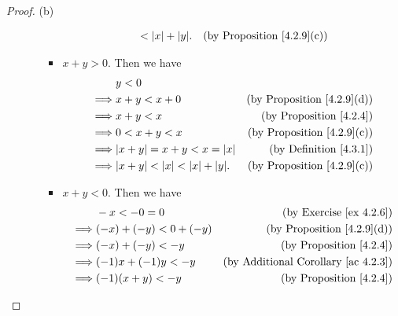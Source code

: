 \begin{proof}{(b)}
\begin{itemize}
\begin{itemize}
\begin{itemize}
\begin{align*}
                                                   & < \abs*{x} + \abs*{y}. & \text{(by Proposition \ref{4.2.9}(c))}
                                  \end{align*}
                            \item \(x + y > 0\).
                                  Then we have
                                  \begin{align*}
                                               & y < 0                                                                                   \\
                                      \implies & x + y < x + 0                                  & \text{(by Proposition \ref{4.2.9}(d))} \\
                                      \implies & x + y < x                                      & \text{(by Proposition \ref{4.2.4})}    \\
                                      \implies & 0 < x + y < x                                  & \text{(by Proposition \ref{4.2.9}(c))} \\
                                      \implies & \abs*{x + y} = x + y < x = \abs*{x}            & \text{(by Definition \ref{4.3.1})}     \\
                                      \implies & \abs*{x + y} < \abs*{x} < \abs*{x} + \abs*{y}. & \text{(by Proposition \ref{4.2.9}(c))}
                                  \end{align*}
                            \item \(x + y < 0\).
                                  Then we have
                                  \begin{align*}
                                               & -x < -0 = 0                                    & \text{(by Exercise \ref{ex 4.2.6})}             \\
                                      \implies & (-x) + (-y) < 0 + (-y)                         & \text{(by Proposition \ref{4.2.9}(d))}          \\
                                      \implies & (-x) + (-y) < -y                               & \text{(by Proposition \ref{4.2.4})}             \\
                                      \implies & (-1)x + (-1)y < -y                             & \text{(by Additional Corollary \ref{ac 4.2.3})} \\
                                      \implies & (-1)(x + y) < -y                               & \text{(by Proposition \ref{4.2.4})}             \\

\end{align*}
\end{itemize}
\end{itemize}
\end{itemize}
\end{proof}
